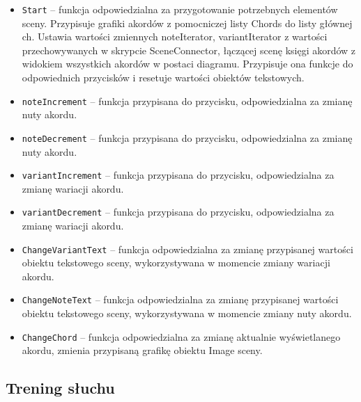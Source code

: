 \begin{itemize}
    \item \texttt{Start} -- funkcja odpowiedzialna za przygotowanie potrzebnych elementów sceny. Przypisuje grafiki akordów z pomocniczej listy Chords do listy głównej ch. Ustawia wartości zmiennych noteIterator, variantIterator z wartości przechowywanych w skrypcie SceneConnector, łączącej scenę księgi akordów z widokiem wszystkich akordów w postaci diagramu. Przypisuje ona funkcje do odpowiednich przycisków i resetuje wartości obiektów tekstowych.
    \item \texttt{noteIncrement} -- funkcja przypisana do przycisku, odpowiedzialna za zmianę nuty akordu.
    \item \texttt{noteDecrement} -- funkcja przypisana do przycisku, odpowiedzialna za zmianę nuty akordu.
    \item \texttt{variantIncrement} -- funkcja przypisana do przycisku, odpowiedzialna za zmianę wariacji akordu.
    \item \texttt{variantDecrement} -- funkcja przypisana do przycisku, odpowiedzialna za zmianę wariacji akordu.
    \item \texttt{ChangeVariantText} -- funkcja odpowiedzialna za zmianę przypisanej wartości obiektu tekstowego sceny, wykorzystywana w momencie zmiany wariacji akordu.
    \item \texttt{ChangeNoteText} -- funkcja odpowiedzialna za zmianę przypisanej wartości obiektu tekstowego sceny, wykorzystywana w momencie zmiany nuty akordu.
    \item \texttt{ChangeChord} -- funkcja odpowiedzialna za zmianę aktualnie wyświetlanego akordu, zmienia przypisaną grafikę obiektu Image sceny.
\end{itemize}

\subsection{Trening słuchu}

